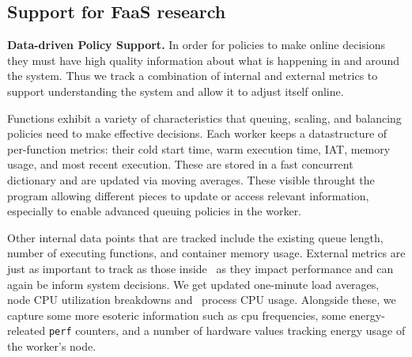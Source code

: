 



\subsection{Support for FaaS research}


\noindent \textbf{Data-driven Policy Support.} \label{sec:data-support}
In order for policies to make online decisions they must have high quality information about what is happening in and around the system.
Thus we track a combination of internal and external metrics to support understanding the system and allow it to adjust itself online.

Functions exhibit a variety of characteristics that queuing, scaling, and balancing policies need to make effective decisions.
Each worker keeps a datastructure of per-function metrics: their cold start time, warm execution time, IAT, memory usage, and most recent execution.
These are stored in a fast concurrent dictionary and are updated via moving averages.
These visible throught the program allowing different pieces to update or access relevant information, especially to enable advanced queuing policies in the worker.

Other internal data points that are tracked include the existing queue length, number of executing functions, and container memory usage.
External metrics are just as important to track as those inside \sysname~as they impact performance and can again be inform system decisions.
We get updated one-minute load averages, node CPU utilization breakdowns and \sysname~process CPU usage.
Alongside these, we capture some more esoteric information such as cpu frequencies, some energy-releated \texttt{perf} counters, and a number of hardware values tracking energy usage of the worker's node.

